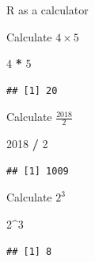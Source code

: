 \documentclass[
  ignorenonframetext,
]{beamer}
\newenvironment{Shaded}{\begin{snugshade}}{\end{snugshade}}
\newcommand{\DecValTok}[1]{\textcolor[rgb]{0.00,0.00,0.81}{#1}}
\newcommand{\OperatorTok}[1]{\textcolor[rgb]{0.81,0.36,0.00}{\textbf{#1}}}
\newcommand{\StringTok}[1]{\textcolor[rgb]{0.31,0.60,0.02}{#1}}
\begin{document}
\begin{frame}[fragile]{R as a calculator}
\protect\hypertarget{r-as-a-calculator-1}{}

Calculate \(4\times 5\)

\begin{Shaded}
\begin{Highlighting}[]
\DecValTok{4} \OperatorTok{*}\StringTok{ }\DecValTok{5}
\end{Highlighting}
\end{Shaded}

\begin{verbatim}
## [1] 20
\end{verbatim}

Calculate \(\frac{2018}{2}\)

\begin{Shaded}
\begin{Highlighting}[]
\DecValTok{2018} \OperatorTok{/}\StringTok{ }\DecValTok{2}
\end{Highlighting}
\end{Shaded}

\begin{verbatim}
## [1] 1009
\end{verbatim}

Calculate \(2^3\)

\begin{Shaded}
\begin{Highlighting}[]
\DecValTok{2}\OperatorTok{^}\DecValTok{3}
\end{Highlighting}
\end{Shaded}

\begin{verbatim}
## [1] 8
\end{verbatim}

\end{frame}
\end{document}
